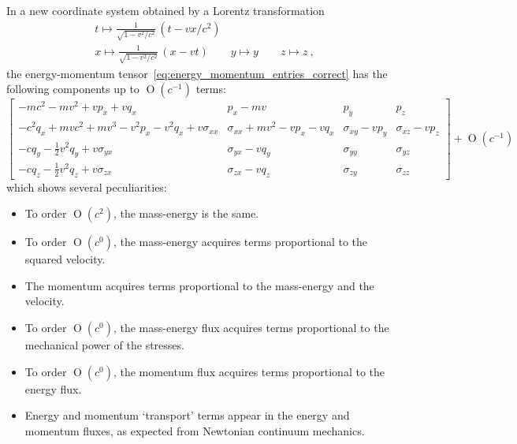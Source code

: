 \documentclass[\ifafour a4paper,12pt,\else a5paper,10pt,\fi%
onecolumn,oneside,article,%
british%
]{memoir}
\DeclareMathOperator{\Ord}{O}%
\renewcommand*{\|}[1][]{\nonscript\:#1\vert\nonscript\:\mathopen{}}
\begin{document}
In a new coordinate system obtained by a Lorentz transformation
\begin{equation}
  \label{eq:lorentz_transf}
  \begin{gathered}
    t \mapsto \tfrac{1}{\sqrt{1-v^{2}/c^{2}}}\, (t - v x/c^{2})
    \\
    x \mapsto \tfrac{1}{\sqrt{1-v^{2}/c^{2}}}\, (x - v t)
    \qquad y \mapsto y \qquad z \mapsto z \ ,
  \end{gathered}
\end{equation}
the energy-momentum tensor~\eqref{eq:energy_momentum_entries_correct} has the following components up to $\Ord(c^{-1})$ terms:
\begin{equation}
  \label{eq:energy_momentum_boost}
    \left[\begin{smallmatrix}
        -m c^{2} - m v^{2} + v p_{x} + v q_{x}
        & p_{x} - m v & p_{y} & p_{z}
    \\
    -c^{2} q_{x} + m v c^{2} + m v^{3}- v^{2} p_{x} - v^{2} q_{x} + v \sigma_{xx}&
    \sigma_{xx} + m v^{2} - v p_{x} - v q_{x}
    & \sigma_{xy} - v p_{y}
    & \sigma_{xz} - v p_{z}
    \\
    -c q_{y} - \frac12 v^{2} q_{y} + v \sigma_{yx}
    & \sigma_{yx} - v q_{y}
    & \sigma_{yy} & \sigma_{yz}
    \\
    -c q_{z} - \frac12 v^{2} q_{z} + v \sigma_{zx}
    & \sigma_{zx} - v q_{z}
    & \sigma_{zy} & \sigma_{zz}
  \end{smallmatrix}\right]
+ \Ord(c^{-1})
\end{equation}
which shows several peculiarities:
\begin{itemize}[noitemsep]
\item To order $\Ord(c^{2})$, the mass-energy is the same.
\item To order $\Ord(c^{0})$, the mass-energy acquires terms proportional to the squared velocity.
\item The momentum acquires terms proportional to the mass-energy and the velocity.
\item To order $\Ord(c^{0})$, the mass-energy flux acquires terms proportional to the mechanical power of the stresses.
\item To order $\Ord(c^{0})$, the momentum flux acquires terms proportional to the energy flux.
\item Energy and momentum \enquote*{transport} terms appear in the energy and momentum fluxes, as expected from Newtonian continuum mechanics.
\end{itemize}
\end{document}
